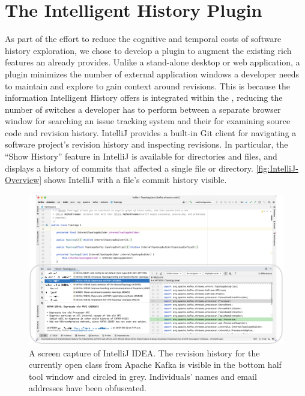 \section{The Intelligent History Plugin}
\label{sec:Implementation}

As part of the effort to reduce the cognitive and temporal costs of software history exploration, 
we chose to develop a plugin to augment the existing rich features an  already provides.
Unlike a stand-alone desktop or web application, a plugin minimizes the number of external application windows a developer needs to maintain and explore to gain context around revisions. 
This is because the information  Intelligent History offers is integrated within the , 
reducing the number of switches a developer has to perform between a separate browser window for searching an issue tracking system 
and their  for examining source code and revision history.
IntelliJ provides a built-in Git client  for navigating a software project's revision history and inspecting revisions. 
In particular, the ``Show History'' feature in IntelliJ is available for directories and files, 
and displays a history of commits that affected a single file or directory.
\autoref{fig:IntelliJ-Overview} shows IntelliJ with a file's commit history visible.

\begin{figure}
    \includegraphics[width=\textwidth]{./images/intellij-overview.png}
    \caption{
        A screen capture of IntelliJ IDEA. 
        The revision history for the currently open  class 
        from Apache Kafka is visible in the bottom half tool window and circled in grey.
        Individuals' names and email addresses have been obfuscated.
    }
    \label{fig:IntelliJ-Overview}
\end{figure}

